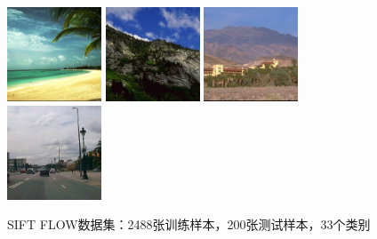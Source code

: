 \begin{figure}[h]
	\centering
	\includegraphics[width=0.25\textwidth,height=.15\textwidth]{demo_images/siftflow/coast_bea10.jpg}
	\includegraphics[width=0.25\textwidth,height=.15\textwidth]{demo_images/siftflow/mountain_n18058.jpg}
	\includegraphics[width=0.25\textwidth,height=.15\textwidth]{demo_images/siftflow/opencountry_land732.jpg}
	\includegraphics[width=0.25\textwidth,height=.15\textwidth]{demo_images/siftflow/highway_gre644.jpg}
	\caption{SIFT FLOW数据集：2488张训练样本，200张测试样本，33个类别}
	\label{fig:crop}
\end{figure}